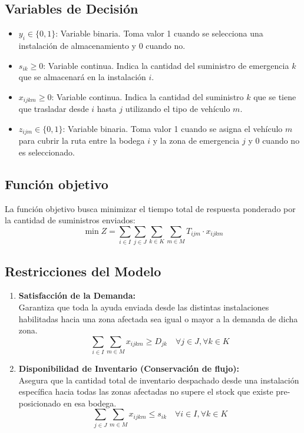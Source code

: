 \documentclass[letterpaper]{article}
\begin{document}
\begin{flushleft}
\subsection{Variables de Decisi\'on}
\begin{itemize}
    \item $y_i \in \{0, 1\}$: Variable binaria. Toma valor 1 cuando se selecciona una instalaci\'on de almacenamiento y 0 cuando no.
    \item $s_{ik} \geq 0$: Variable continua. Indica la cantidad del suministro de emergencia $k$ que se almacenar\'a en la instalaci\'on $i$.
    \item $x_{ijkm} \geq 0$: Variable continua. Indica la cantidad del suministro $k$ que se tiene que trasladar desde $i$ hasta $j$ utilizando el tipo de veh\'iculo $m$.
    \item $z_{ijm} \in \{0, 1\}$: Variable binaria. Toma valor 1 cuando se asigna el veh\'iculo $m$ para cubrir la ruta entre la bodega $i$ y la zona de emergencia $j$ y 0 cuando no es seleccionado.
\end{itemize}

\subsection{Funci\'on objetivo}
La funci\'on objetivo busca minimizar el tiempo total de respuesta ponderado por la cantidad de suministros enviados:
\begin{equation}
\min Z = \sum_{i \in I} \sum_{j \in J} \sum_{k \in K} \sum_{m \in M} T_{ijm} \cdot x_{ijkm}
\end{equation}

\subsection{Restricciones del Modelo}
\begin{enumerate}
    \item \textbf{Satisfacci\'on de la Demanda:}\\
    Garantiza que toda la ayuda enviada desde las distintas instalaciones habilitadas hacia una zona afectada sea igual o mayor a la demanda de dicha zona.
    \begin{equation}
        \sum_{i \in I}\sum_{m \in M} x_{ijkm} \geq D_{jk} \quad \forall j \in J, \forall k \in K
    \end{equation}

    \item \textbf{Disponibilidad de Inventario (Conservaci\'on de flujo):}\\
    Asegura que la cantidad total de inventario despachado desde una instalaci\'on espec\'ifica hacia todas las zonas afectadas no supere el stock que existe pre-posicionado en esa bodega.
    \begin{equation}
        \sum_{j \in J}\sum_{m \in M} x_{ijkm} \leq s_{ik} \quad \forall i \in I, \forall k \in K
    \end{equation}


\end{enumerate}
\end{flushleft}
\end{document}
